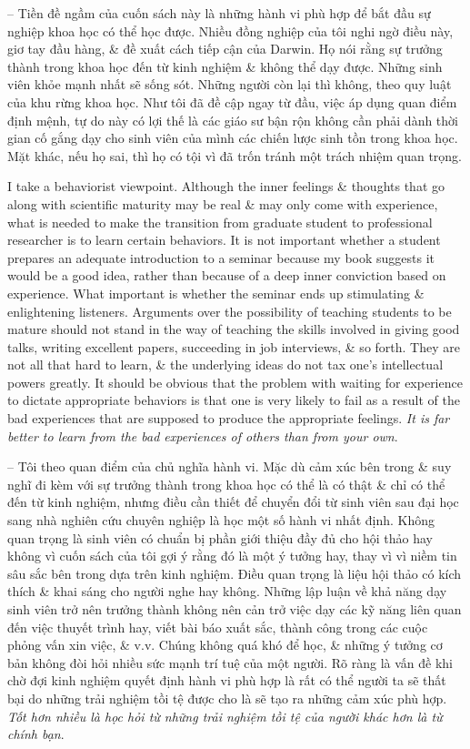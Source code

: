 \documentclass{article}
\begin{document}
\begin{enumerate}
\begin{itemize}
		-- Tiền đề ngầm của cuốn sách này là những hành vi phù hợp để bắt đầu sự nghiệp khoa học có thể học được. Nhiều đồng nghiệp của tôi nghi ngờ điều này, giơ tay đầu hàng, \& đề xuất cách tiếp cận của Darwin. Họ nói rằng sự trưởng thành trong khoa học đến từ kinh nghiệm \& không thể dạy được. Những sinh viên khỏe mạnh nhất sẽ sống sót. Những người còn lại thì không, theo quy luật của khu rừng khoa học. Như tôi đã đề cập ngay từ đầu, việc áp dụng quan điểm định mệnh, tự do này có lợi thế là các giáo sư bận rộn không cần phải dành thời gian cố gắng dạy cho sinh viên của mình các chiến lược sinh tồn trong khoa học. Mặt khác, nếu họ sai, thì họ có tội vì đã trốn tránh một trách nhiệm quan trọng.
		
		I take a behaviorist viewpoint. Although the inner feelings \& thoughts that go along with scientific maturity may be real \& may only come with experience, what is needed to make the transition from graduate student to professional researcher is to learn certain behaviors. It is not important whether a student prepares an adequate introduction to a seminar because my book suggests it would be a good idea, rather than because of a deep inner conviction based on experience. What {\it } important is whether the seminar ends up stimulating \& enlightening listeners. Arguments over the possibility of teaching students to be mature should not stand in the way of teaching the skills involved in giving good talks, writing excellent papers, succeeding in job interviews, \& so forth. They are not all that hard to learn, \& the underlying ideas do not tax one's intellectual powers greatly. It should be obvious that the problem with waiting for experience to dictate appropriate behaviors is that one is very likely to fail as a result of the bad experiences that are supposed to produce the appropriate feelings. {\it It is far better to learn from the bad experiences of others than from your own}.
		
		-- Tôi theo quan điểm của chủ nghĩa hành vi. Mặc dù cảm xúc bên trong \& suy nghĩ đi kèm với sự trưởng thành trong khoa học có thể là có thật \& chỉ có thể đến từ kinh nghiệm, nhưng điều cần thiết để chuyển đổi từ sinh viên sau đại học sang nhà nghiên cứu chuyên nghiệp là học một số hành vi nhất định. Không quan trọng là sinh viên có chuẩn bị phần giới thiệu đầy đủ cho hội thảo hay không vì cuốn sách của tôi gợi ý rằng đó là một ý tưởng hay, thay vì vì niềm tin sâu sắc bên trong dựa trên kinh nghiệm. Điều {\it } quan trọng là liệu hội thảo có kích thích \& khai sáng cho người nghe hay không. Những lập luận về khả năng dạy sinh viên trở nên trưởng thành không nên cản trở việc dạy các kỹ năng liên quan đến việc thuyết trình hay, viết bài báo xuất sắc, thành công trong các cuộc phỏng vấn xin việc, \& v.v. Chúng không quá khó để học, \& những ý tưởng cơ bản không đòi hỏi nhiều sức mạnh trí tuệ của một người. Rõ ràng là vấn đề khi chờ đợi kinh nghiệm quyết định hành vi phù hợp là rất có thể người ta sẽ thất bại do những trải nghiệm tồi tệ được cho là sẽ tạo ra những cảm xúc phù hợp. {\it Tốt hơn nhiều là học hỏi từ những trải nghiệm tồi tệ của người khác hơn là từ chính bạn}.
		

\end{itemize}
\end{enumerate}
\end{document}

